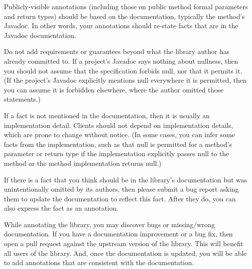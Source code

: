 
Publicly-visible annotations (including those on public method formal
parameters and return types) should be based on the
documentation, typically the method's Javadoc.
In other words, your annotations should re-state facts that are in the Javadoc
documentation.

Do not add requirements or guarantees beyond what the library author has
already committed to.  If a project's Javadoc says nothing about nullness,
then you should not assume that the specification forbids null, nor that it
permits it.
(If the project's Javadoc explicitly mentions null everywhere it is permitted,
then you can assume it is forbidden elsewhere, where the author omitted those
statements.)

If a fact is not mentioned in the documentation, then it is usually an
implementation detail.  Clients should not depend on implementation
details, which are prone to change without notice.
(In some cases, you can infer some facts from the
implementation, such as that null is permitted for a method's parameter or
return type if the implementation explicitly passes null to the method or
the method implementation returns null.)

If there is a fact that you think should be in the library's documentation
but was unintentionally omitted by its authors, then please submit a bug
report asking them to update the documentation to reflect this fact.  After
they do, you can also express the fact as an annotation.




While annotating the library, you may discover bugs or missing/wrong
documentation.  If you have a documentation improvement or a bug fix, then
open a pull request against the upstream version of the library.  This will
benefit all users of the library.  And, once the documentation is updated,
you will be able to add annotations that are consistent with the
documentation.



